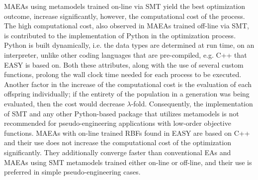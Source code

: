 

MAEAs using metamodels trained on-line via SMT yield the best 
optimization outcome, increase significantly, however, the 
computational cost of the process. The high computational cost, 
also observed in MAEAs trained off-line via SMT, is contributed to 
the implementation of Python in the optimization process. Python
is built dynamically, i.e. the data types are determined at run 
time, on an interpreter, unlike other coding languages that are 
pre-compiled, e.g. C++ that EASY is based on. Both these 
attributes, along with the use of several custom functions, prolong 
the wall clock time needed for each process to be executed.
Another factor in the increase of the computational cost is the 
evaluation of each offspring individually; if the entirety of the 
population in a generation was being evaluated, then the cost would 
decrease $λ$-fold. Consequently, the implementation of SMT and any 
other Python-based package that utilizes metamodels is not 
recommended for pseudo-engineering applications with low-order 
objective functions. MAEAs with on-line trained RBFs found in EASY 
are based on C++ and their use does not increase the computational 
cost of the optimization significantly. They additionally converge 
faster than conventional EAs and MAEAs using SMT metamodels 
trained either on-line or off-line, and their use is preferred in 
simple pseudo-engineering cases.